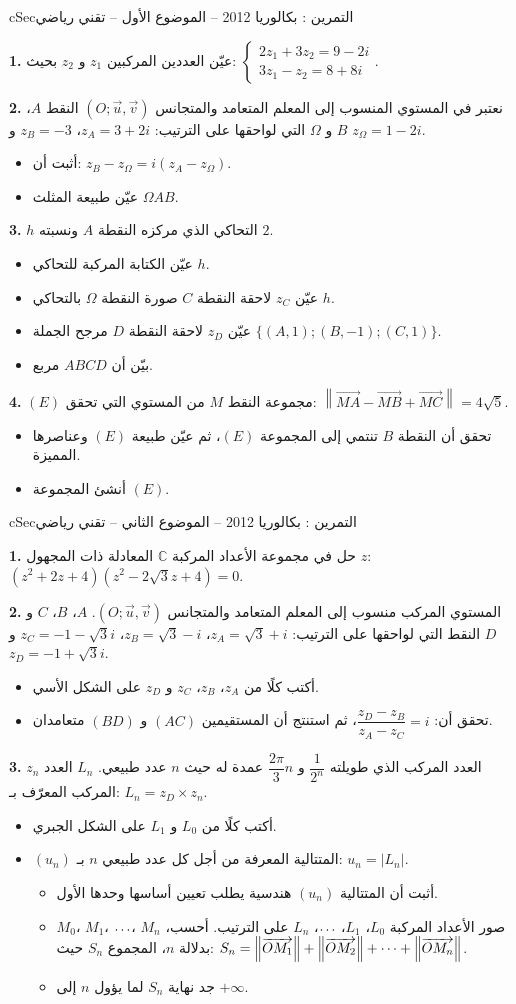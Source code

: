 \documentclass[12pt,a4paper]{article}
\newenvironment{BOX}[2]{\begin{otherlanguage}{english}\begin{arbox}{#1}{#2}}{\end{arbox}\end{otherlanguage}}
\newcounter{exo}
\newenvironment{tamrin}[1]{\stepcounter{exo}\begin{BOX}{cSec}{التمرين \theexo: #1}}{\end{BOX}}
\renewcommand{\ldots}{\mathinner{\ldotp\ldotp\ldotp}}
\renewcommand{\cdots}{\mathinner{\cdotp\cdotp\cdotp}}
\newenvironment{sq}{\begin{itemize}[leftmargin=2.4em,itemsep=3pt]}{\end{itemize}}
\newcommand{\qa}{\item[(أ)]}\newcommand{\qb}{\item[(ب)]}\newcommand{\qc}{\item[(جـ)]}\newcommand{\qd}{\item[(د)]}\newcommand{\qe}{\item[(هـ)]}
\newcommand{\QQ}[1]{\par\smallskip\textbf{#1.} }
\begin{document}
\begin{tamrin}{بكالوريا 2012 -- الموضوع الأول -- تقني رياضي}
\QQ{1} عيّن العددين المركبين $z_1$ و $z_2$ بحيث: $\begin{cases}2z_1+3z_2=9-2i\\ 3z_1-z_2=8+8i\end{cases}$.
\QQ{2} نعتبر في المستوي المنسوب إلى المعلم المتعامد والمتجانس $(O;\vec u,\vec v)$ النقط $A$، $B$ و $\Omega$ التي لواحقها على الترتيب:
$z_A=3+2i$، $z_B=-3$ و $z_\Omega=1-2i$.
\begin{sq}
\qa أثبت أن: $z_B-z_\Omega=i(z_A-z_\Omega)$.
\qb عيّن طبيعة المثلث $\Omega AB$.
\end{sq}
\QQ{3} $h$ التحاكي الذي مركزه النقطة $A$ ونسبته $2$.
\begin{sq}
\qa عيّن الكتابة المركبة للتحاكي $h$.
\qb عيّن $z_C$ لاحقة النقطة $C$ صورة النقطة $\Omega$ بالتحاكي $h$.
\qc عيّن $z_D$ لاحقة النقطة $D$ مرجح الجملة $\{(A,1);(B,-1);(C,1)\}$.
\qd بيّن أن $ABCD$ مربع.
\end{sq}
\QQ{4} $(E)$ مجموعة النقط $M$ من المستوي التي تحقق: $\left\|\overrightarrow{MA}-\overrightarrow{MB}+\overrightarrow{MC}\right\|=4\sqrt5$.
\begin{sq}
\qa تحقق أن النقطة $B$ تنتمي إلى المجموعة $(E)$، ثم عيّن طبيعة $(E)$ وعناصرها المميزة.
\qb أنشئ المجموعة $(E)$.
\end{sq}
\end{tamrin}

\begin{tamrin}{بكالوريا 2012 -- الموضوع الثاني -- تقني رياضي}
\QQ{1} حل في مجموعة الأعداد المركبة $\mathbb{C}$ المعادلة ذات المجهول $z$: $(z^2+2z+4)(z^2-2\sqrt3z+4)=0$.
\QQ{2} المستوي المركب منسوب إلى المعلم المتعامد والمتجانس $(O;\vec u,\vec v)$.
$A$، $B$، $C$ و $D$ النقط التي لواحقها على الترتيب: $z_A=\sqrt3+i$، $z_B=\sqrt3-i$، $z_C=-1-\sqrt3 i$ و $z_D=-1+\sqrt3 i$.
\begin{sq}
\qa أكتب كلًا من $z_A$، $z_B$، $z_C$ و $z_D$ على الشكل الأسي.
\qb تحقق أن: $\dfrac{z_D-z_B}{z_A-z_C}=i$، ثم استنتج أن المستقيمين $(AC)$ و $(BD)$ متعامدان.
\end{sq}
\QQ{3} $z_n$ العدد المركب الذي طويلته $\dfrac{1}{2^n}$ و $\dfrac{2\pi}{3}n$ عمدة له حيث $n$ عدد طبيعي.
$L_n$ العدد المركب المعرّف بـ: $L_n=z_D\times z_n$.
\begin{sq}
\qa أكتب كلًا من $L_0$ و $L_1$ على الشكل الجبري.
\qb $(u_n)$ المتتالية المعرفة من أجل كل عدد طبيعي $n$ بـ: $u_n=|L_n|$.
\begin{itemize}
\item أثبت أن المتتالية $(u_n)$ هندسية يطلب تعيين أساسها وحدها الأول.
\item $M_0$، $M_1$، $\ldots$، $M_n$ صور الأعداد المركبة $L_0$، $L_1$، $\ldots$، $L_n$ على الترتيب.
أحسب، بدلالة $n$، المجموع $S_n$ حيث: $S_n=\left\|\overrightarrow{OM_1}\right\|+\left\|\overrightarrow{OM_2}\right\|+\cdots+\left\|\overrightarrow{OM_n}\right\|$.
\item جد نهاية $S_n$ لما يؤول $n$ إلى $+\infty$.
\end{itemize}
\end{sq}
\end{tamrin}
\end{document}
